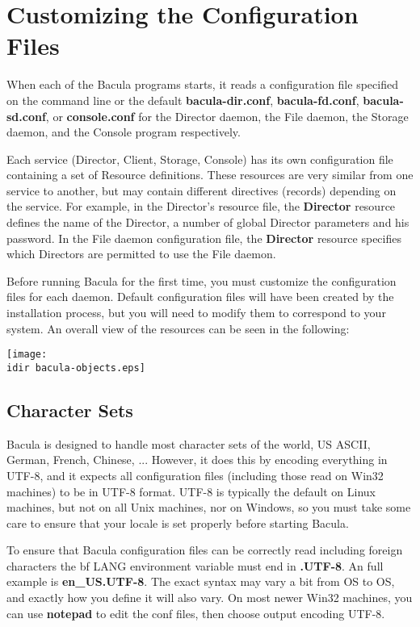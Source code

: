
\chapter{Customizing the Configuration Files}
\label{ConfigureChapter}

When each of the Bacula programs starts, it reads a configuration file
specified on the command line or the default {\bf bacula-dir.conf}, {\bf
bacula-fd.conf}, {\bf bacula-sd.conf}, or {\bf console.conf} for the Director
daemon, the File daemon, the Storage daemon, and the Console program
respectively. 

Each service (Director, Client, Storage, Console) has its own configuration
file containing a set of Resource definitions. These resources are very
similar from one service to another, but may contain different directives
(records) depending on the service. For example, in the Director's resource
file, the {\bf Director} resource defines the name of the Director, a number
of global Director parameters and his password. In the File daemon
configuration file, the {\bf Director} resource specifies which Directors are
permitted to use the File daemon. 

Before running Bacula for the first time, you must customize the configuration
files for each daemon. Default configuration files will have been created by
the installation process, but you will need to modify them to correspond to
your system. An overall view of the resources can be seen in the following: 

\texttt{[image: \\idir bacula-objects.eps]} 
\label{ResFormat}

\section{Character Sets}
Bacula is designed to handle most character sets of the world,
US ASCII, German, French, Chinese, ...  However, it does this by
encoding everything in UTF-8, and it expects all configuration files
(including those read on Win32 machines) to be in UTF-8 format.
UTF-8 is typically the default on Linux machines, but not on all
Unix machines, nor on Windows, so you must take some care to ensure
that your locale is set properly before starting Bacula.  

To ensure that Bacula configuration files can be correctly read including
foreign characters the {bf LANG} environment variable
must end in {\bf .UTF-8}. An full example is {\bf en\_US.UTF-8}. The
exact syntax may vary a bit from OS to OS, and exactly how you define
it will also vary.  On most newer Win32 machines, you can use {\bf notepad}
to edit the conf files, then choose output encoding UTF-8.

